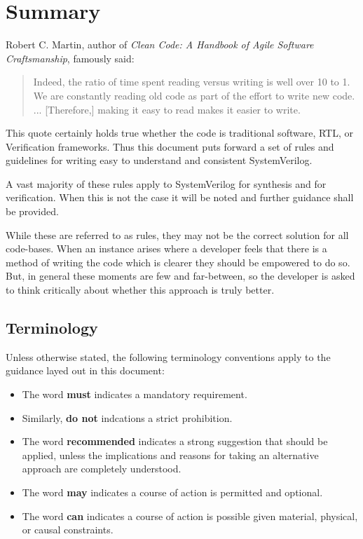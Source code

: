 \chapter{Summary}
\label{summary}

  Robert C. Martin, author of \textit{Clean Code: A Handbook of Agile Software Craftsmanship}, famously said:
  \begin{quote}
  Indeed, the ratio of time spent reading versus writing is well over 10 to 1.
  We are constantly reading old code as part of the effort to write new code.
  ... [Therefore,] making it easy to read makes it easier to write.
  \end{quote}
  This quote certainly holds true whether the code is traditional software, RTL, or Verification frameworks.
  Thus this document puts forward a set of rules and guidelines for writing easy to understand and consistent SystemVerilog.

  A vast majority of these rules apply to SystemVerilog for synthesis and for verification.
  When this is not the case it will be noted and further guidance shall be provided.

  While these are referred to as rules, they may not be the correct solution for all code-bases.
  When an instance arises where a developer feels that there is a method of writing the code which is clearer they should be empowered to do so.
  But, in general these moments are few and far-between, so the developer is asked to think critically about whether this approach is truly better.

  \section{Terminology}
  \label{summary:terminology}

    Unless otherwise stated, the following terminology conventions apply to the guidance layed out in this document:

    \begin{itemize}
      \item The word \textbf{must} indicates a mandatory requirement.
      \item Similarly, \textbf{do not} indcations a strict prohibition.
      \item The word \textbf{recommended} indicates a strong suggestion that should be applied, unless the implications and reasons for taking an alternative approach are completely understood.
      \item The word \textbf{may} indicates a course of action is permitted and optional.
      \item The word \textbf{can} indicates a course of action is possible given material, physical, or causal constraints.
    \end{itemize}

